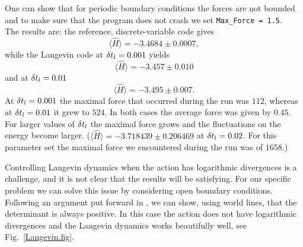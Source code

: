 One can show that for periodic boundary conditions the   forces are not bounded 
and to make sure that the program does not crash we set \texttt{Max\_Force = 1.5}.\\
The results are: the reference, discrete-variable code gives
\begin{equation}
 \langle  \hat{H} \rangle  =  -3.4684 \pm 0.0007,
\end{equation} 
while the Langevin code at $ \delta t_{l} = 0.001$  yields 
\begin{equation}
 \langle  \hat{H} \rangle  =  -3.457 \pm 0.010 
\end{equation} 
and at $ \delta t_{l} = 0.01$
\begin{equation}
 \langle  \hat{H} \rangle  = -3.495 \pm 0.007\text{.}
\end{equation} 
 At $ \delta t_{l} = 0.001$   the maximal force that occurred during the run was 
$ 112$, whereas at $ \delta t_{l} = 0.01$ it grew to $524$.    In both cases the average force was given by $0.45$.   For larger values of  $ \delta t_{l} $ the maximal force grows and the fluctuations on the energy become  larger.  
($ \langle  \hat{H} \rangle  =  -3.718439    \pm   0.206469 $  at $ \delta t_{l} = 0.02$. For this parameter set  the maximal force we encountered during the run was of $1658$.)

Controlling Langevin dynamics when the action has logarithmic divergences is a challenge, and it is not clear  that the results will be satisfying.  For our specific problem we can solve this issue by considering open boundary conditions. Following an argument put forward in \cite{Assaad07}, we can show, using world lines, that the determinant is always positive.   In this case the  action does not  have logarithmic divergences and the Langevin dynamics works beautifully well, see Fig.~\ref{Langevin.fig}. 

